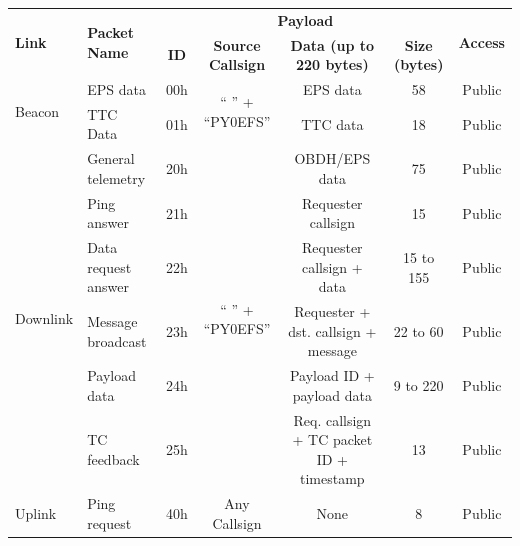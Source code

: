 \begin{landscape}
    \begin{table}[ht]
        \centering
        \begin{tabular}{llccccc}
            \toprule[1.5pt]
            \multirow{2}{*}{\textbf{Link}} & \multirow{2}{*}{\textbf{Packet Name}} & \multicolumn{4}{c}{\textbf{Payload}} & \multirow{2}{*}{\textbf{Access}} \\
            \cmidrule{3-6}
                                      &                       & \textbf{ID}  & \textbf{Source Callsign}   & \textbf{Data (up to 220 bytes)}            & \textbf{Size (bytes)} & \\
            \midrule
            \multirow{2}{*}{Beacon}   & EPS data              & 00h & \multirow{2}{*}{`` '' + ``PY0EFS''} & EPS data                                   & 58                    & Public \\
                                      & TTC Data              & 01h &                                     & TTC data                                   & 18                    & Public \\
            \midrule
            \multirow{6}{*}{Downlink} & General telemetry     & 20h & \multirow{6}{*}{`` '' + ``PY0EFS''} & OBDH/EPS data                              & 75                    & Public \\
                                      & Ping answer           & 21h &                                     & Requester callsign                         & 15                    & Public \\
                                      & Data request answer   & 22h &                                     & Requester callsign + data                  & 15 to 155             & Public \\
                                      & Message broadcast     & 23h &                                     & Requester + dst. callsign + message        & 22 to 60              & Public \\
                                      & Payload data          & 24h &                                     & Payload ID + payload data                  & 9 to 220              & Public \\
                                      & TC feedback           & 25h &                                     & Req. callsign + TC packet ID + timestamp   & 13                    & Public \\
            \midrule
            \multirow{12}{*}{Uplink}  & Ping request          & 40h & \multirow{12}{*}{Any Callsign}      & None                                       & 8                     & Public \\

\end{tabular}
\end{table}
\end{landscape}
